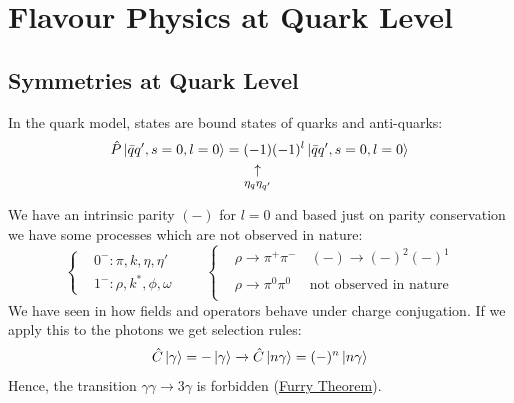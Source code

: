 \documentclass[../main.tex]{subfiles}
\begin{document}
\setchapterpreamble[u]{\margintoc}
\chapter[Flavour Physics at Quark Level]{Flavour Physics at Quark Level\footnotemark[0]}
\section{Symmetries at Quark Level}
In the quark model, states are bound states of quarks and anti-quarks:
\[
\hat{P}\ket{\bar{q}q',s=0,l=0}=\underset{\mathclap{\tikz \node {$\uparrow$} node [below=1ex] {\footnotesize  $\eta_q\eta_{q'}$};}}{(-1)}(-1)^l\ket{\bar{q}q',s=0,l=0}
\]
We have an intrinsic parity $(-)$ for $l=0$ and based just on parity conservation we have some processes which are not observed in nature:
\[
\left\{
\begin{aligned}
&0^-: \pi,k,\eta,\eta'\\
&1^-: \rho,k^*,\phi,\omega
\end{aligned}
\right.
\qquad
\left\{
\begin{aligned}
&\rho\xrightarrow[]{}\pi^+\pi^- \quad (-)\xrightarrow[]{}(-)^2(-)^1\\
&\rho\xrightarrow[]{}\pi^0\pi^0 \quad \text{ not observed in nature}
\end{aligned}
\right.
\]
We have seen in  how fields and operators behave under charge conjugation. If we apply this to the photons we get selection rules:
\[
\hat{C}\ket{\gamma}=-\ket{\gamma}\xrightarrow[]{}\hat{C}\ket{n\gamma}=(-)^n\ket{n\gamma}
\]
Hence, the transition $\gamma\gamma\xrightarrow[]{}3\gamma$ is forbidden (\href{https://en.wikipedia.org/wiki/Furry's_theorem}{Furry Theorem}).
\end{document}
